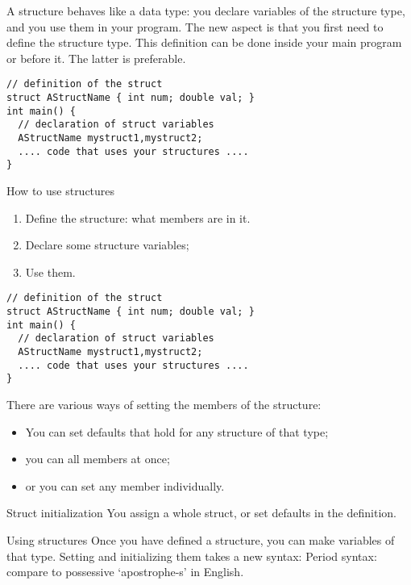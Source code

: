 A structure behaves like a data type: you declare variables of the
structure type, and you use them in your program. The new aspect is
that you first need to define the structure type. This definition can
be done inside your main program or before it. The latter is
preferable.

\begin{lstlisting}
// definition of the struct
struct AStructName { int num; double val; }
int main() {
  // declaration of struct variables
  AStructName mystruct1,mystruct2;
  .... code that uses your structures ....
}
\end{lstlisting}

\begin{slide}{How to use structures}
  \label{sl:structinprog}
  \begin{enumerate}
  \item Define the structure: what members are in it.
  \item Declare some structure variables;
  \item Use them.
  \end{enumerate}
\begin{lstlisting}
// definition of the struct
struct AStructName { int num; double val; }
int main() {
  // declaration of struct variables
  AStructName mystruct1,mystruct2;
  .... code that uses your structures ....
}
\end{lstlisting}
\end{slide}

There are various ways of setting the members of the structure:
\begin{itemize}
\item You can set defaults that hold for any structure of that type;
\item you can all members at once;
\item or you can set any member individually.
\end{itemize}

\begin{block}{Struct initialization}
  \label{sl:structinit}
  You assign a whole struct, or set defaults in the definition.
\end{block}

\begin{block}{Using structures}
  \label{sl:struct-use}
  Once you have defined a structure, you can make variables of that
  type. Setting and initializing them takes a new syntax:
  Period syntax: compare to possessive `apostrophe-s' in English.
\end{block}

